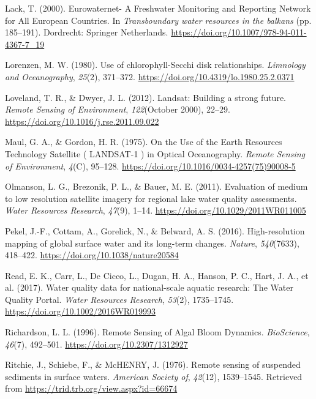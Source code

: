 \documentclass[]{article}
\begin{document}
\leavevmode\hypertarget{ref-Lack2000}{}%
Lack, T. (2000). Eurowaternet- A Freshwater Monitoring and Reporting
Network for All European Countries. In \emph{Transboundary water
resources in the balkans} (pp. 185--191). Dordrecht: Springer
Netherlands. \url{https://doi.org/10.1007/978-94-011-4367-7_19}

\leavevmode\hypertarget{ref-Lorenzen1980}{}%
Lorenzen, M. W. (1980). Use of chlorophyll-Secchi disk relationships.
\emph{Limnology and Oceanography}, \emph{25}(2), 371--372.
\url{https://doi.org/10.4319/lo.1980.25.2.0371}

\leavevmode\hypertarget{ref-Loveland2012}{}%
Loveland, T. R., \& Dwyer, J. L. (2012). Landsat: Building a strong
future. \emph{Remote Sensing of Environment}, \emph{122}(October 2000),
22--29. \url{https://doi.org/10.1016/j.rse.2011.09.022}

\leavevmode\hypertarget{ref-Maul1975}{}%
Maul, G. A., \& Gordon, H. R. (1975). On the Use of the Earth Resources
Technology Satellite ( LANDSAT-1 ) in Optical Oceanography. \emph{Remote
Sensing of Environment}, \emph{4}(C), 95--128.
\url{https://doi.org/10.1016/0034-4257(75)90008-5}

\leavevmode\hypertarget{ref-Olmanson2011}{}%
Olmanson, L. G., Brezonik, P. L., \& Bauer, M. E. (2011). Evaluation of
medium to low resolution satellite imagery for regional lake water
quality assessments. \emph{Water Resources Research}, \emph{47}(9),
1--14. \url{https://doi.org/10.1029/2011WR011005}

\leavevmode\hypertarget{ref-Pekel2016}{}%
Pekel, J.-F., Cottam, A., Gorelick, N., \& Belward, A. S. (2016).
High-resolution mapping of global surface water and its long-term
changes. \emph{Nature}, \emph{540}(7633), 418--422.
\url{https://doi.org/10.1038/nature20584}

\leavevmode\hypertarget{ref-Read2017}{}%
Read, E. K., Carr, L., De Cicco, L., Dugan, H. A., Hanson, P. C., Hart,
J. A., et al. (2017). Water quality data for national-scale aquatic
research: The Water Quality Portal. \emph{Water Resources Research},
\emph{53}(2), 1735--1745. \url{https://doi.org/10.1002/2016WR019993}

\leavevmode\hypertarget{ref-Richardson1996}{}%
Richardson, L. L. (1996). Remote Sensing of Algal Bloom Dynamics.
\emph{BioScience}, \emph{46}(7), 492--501.
\url{https://doi.org/10.2307/1312927}

\leavevmode\hypertarget{ref-Ritchie1976}{}%
Ritchie, J., Schiebe, F., \& McHENRY, J. (1976). Remote sensing of
suspended sediments in surface waters. \emph{American Society of},
\emph{42}(12), 1539--1545. Retrieved from
\url{https://trid.trb.org/view.aspx?id=66674}
\end{document}
